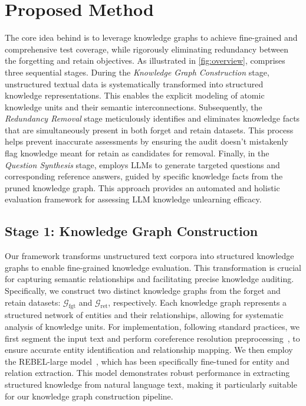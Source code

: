 \section{Proposed Method}
\label{sec:method}


The core idea behind \sys is to leverage knowledge graphs to achieve fine-grained and comprehensive test coverage, while rigorously eliminating redundancy between the forgetting and retain objectives. 
As illustrated in \autoref{fig:overview}, \sys comprises three sequential stages. 
During the \textit{Knowledge Graph Construction} stage, unstructured textual data is systematically transformed into structured knowledge representations. This enables the explicit modeling of atomic knowledge units and their semantic interconnections.
Subsequently, the \textit{Redundancy Removal} stage meticulously identifies and eliminates knowledge facts that are simultaneously present in both forget and retain datasets.
This process helps prevent inaccurate assessments by ensuring the audit doesn't mistakenly flag knowledge meant for retain as candidates for removal. 
Finally, in the \textit{Question Synthesis} stage, \sys employs LLMs to generate targeted questions and corresponding reference answers, guided by specific knowledge facts from the pruned knowledge graph. 
This approach provides an automated and holistic evaluation framework for assessing LLM knowledge unlearning efficacy.



\subsection{Stage 1: Knowledge Graph Construction}
Our framework transforms unstructured text corpora into structured knowledge graphs to enable fine-grained knowledge evaluation. This transformation is crucial for capturing semantic relationships and facilitating precise knowledge auditing. Specifically, we construct two distinct knowledge graphs from the forget and retain datasets: \(\mathcal{G}_{\text{fgt}}\) and \(\mathcal{G}_{\text{ret}}\), respectively. Each knowledge graph represents a structured network of entities and their relationships, allowing for systematic analysis of knowledge units.
For implementation, following standard practices, we first segment the input text and perform coreference resolution preprocessing~\cite{lee2017end}, to ensure accurate entity identification and relationship mapping. We then employ the REBEL-large model~\cite{huguet-cabot-navigli-2021-rebel-relation}, which has been specifically fine-tuned for entity and relation extraction. This model demonstrates robust performance in extracting structured knowledge from natural language text, making it particularly suitable for our knowledge graph construction pipeline.

